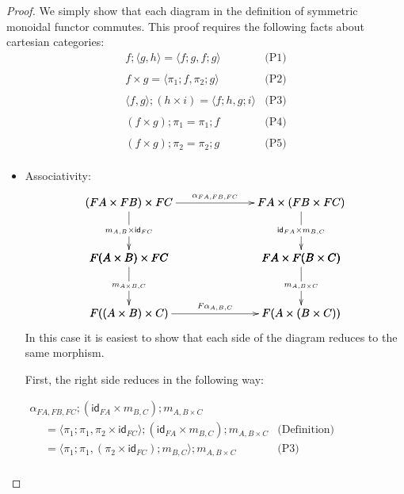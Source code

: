 \documentclass{article}
\newcommand{\id}[0]{\mathsf{id}}
\begin{document}
\begin{proof}
  We simply show that each diagram in the definition of symmetric
  monoidal functor commutes.  This proof requires the following facts
  about cartesian categories:
  \[
  \begin{array}{lll}
    f;\langle g , h \rangle = \langle f;g, f;g \rangle & \text{(P1)}\\
    \\
    f \times g = \langle \pi_1;f , \pi_2;g \rangle & \text{(P2)}\\
    \\
    \langle f , g \rangle;(h \times i) = \langle f;h, g;i \rangle & \text{(P3)}\\
    \\
    (f \times g);\pi_1 = \pi_1;f & \text{(P4)}\\
    \\
    (f \times g);\pi_2 = \pi_2;g & \text{(P5)}\\
  \end{array}
  \]
  \begin{itemize}
  \item[] Associativity:\ \\
    \[
    \bfig
    \vSquares|ammmmma|/->`->`->``->`->`->/[
      (FA \times FB) \times FC`
      FA \times (FB \times FC)`
      F(A \times B) \times FC`
      FA \times F(B \times C)`
      F((A \times B) \times C)`
      F(A \times (B \times C));
      {\alpha}_{FA,FB,FC}`
      m_{A,B} \times \id_{FC}`
      \id_{FA} \times m_{B,C}``
      m_{A \times B,C}`
      m_{A,B \times C}`
      F{\alpha}_{A,B,C}]
    \efig
    \]
    In this case it is easiest to show that each side of the diagram
    reduces to the same morphism.

    First, the right side reduces in the following way:
    \begin{center}
      \begin{math}
        \begin{array}{lll}
          \alpha_{FA,FB,FC};(\id_{FA} \times m_{B,C});m_{A,B \times C} \\
          \,\,\,\,\,\,\,\,= \langle \pi_1;\pi_1, \pi_2 \times \id_{FC} \rangle;(\id_{FA} \times m_{B,C});m_{A,B \times C} & \text{(Definition)}\\
          \,\,\,\,\,\,\,\,= \langle \pi_1;\pi_1, (\pi_2 \times \id_{FC});m_{B,C} \rangle;m_{A,B \times C} & \text{(P3)}\\
        \end{array}
      \end{math}
    \end{center}


\end{itemize}
\end{proof}
\end{document}
